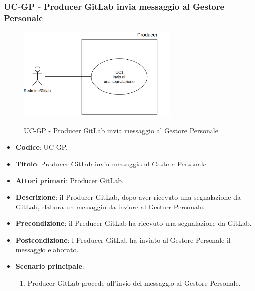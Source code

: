 \subsubsection{UC\theuccount-GP - Producer GitLab invia messaggio al Gestore Personale}
	\begin{figure}[H]
		\centering
		\includegraphics[width=0.7\textwidth]{img/UC1.png}\\
		\caption{UC\theuccount-GP - Producer GitLab invia messaggio al Gestore Personale}
	\end{figure}
	\begin{itemize}
		\item \textbf{Codice}: UC\theuccount-GP.
		\item \textbf{Titolo}: Producer GitLab invia messaggio al Gestore Personale.
		\item \textbf{Attori primari}: Producer GitLab.
		\item \textbf{Descrizione}: il Producer GitLab, dopo aver ricevuto una segnalazione da GitLab, elabora un messaggio da inviare al Gestore Personale.
		\item \textbf{Precondizione}: il Producer GitLab ha ricevuto una segnalazione da GitLab.
		\item \textbf{Postcondizione}: l Producer GitLab ha inviato al Gestore Personale il messaggio elaborato.
		\item \textbf{Scenario principale}: 
		\begin{enumerate}
			\item Producer GitLab procede all'invio del messaggio al Gestore Personale.
		\end{enumerate}
		
	\end{itemize}
	
